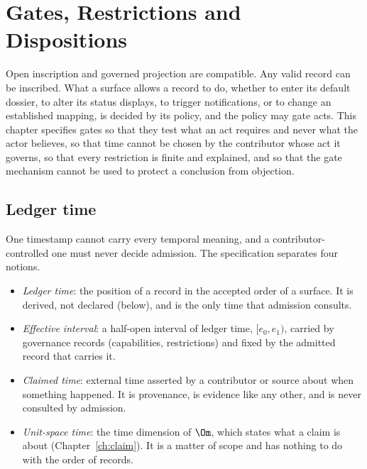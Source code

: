 \chapter{Gates, Restrictions and Dispositions}\label{ch:gates}

Open inscription and governed projection are compatible. Any valid record can be inscribed. What a surface allows a record to do, whether to enter its default dossier, to alter its status displays, to trigger notifications, or to change an established mapping, is decided by its policy, and the policy may gate acts. This chapter specifies gates so that they test what an act requires and never what the actor believes, so that time cannot be chosen by the contributor whose act it governs, so that every restriction is finite and explained, and so that the gate mechanism cannot be used to protect a conclusion from objection.

\section{Ledger time}\label{sec:ledgertime}

One timestamp cannot carry every temporal meaning, and a contributor-controlled one must never decide admission. The specification separates four notions.
\begin{itemize}
\item \emph{Ledger time}: the position of a record in the accepted order of a surface. It is derived, not declared (below), and is the only time that admission consults.
\item \emph{Effective interval}: a half-open interval of ledger time, $[e_0,e_1)$, carried by governance records (capabilities, restrictions) and fixed by the admitted record that carries it.
\item \emph{Claimed time}: external time asserted by a contributor or source about when something happened. It is provenance, is evidence like any other, and is never consulted by admission.
\item \emph{Unit-space time}: the time dimension of $\Om$, which states what a claim is about (Chapter~\ref{ch:claim}). It is a matter of scope and has nothing to do with the order of records.
\end{itemize}

